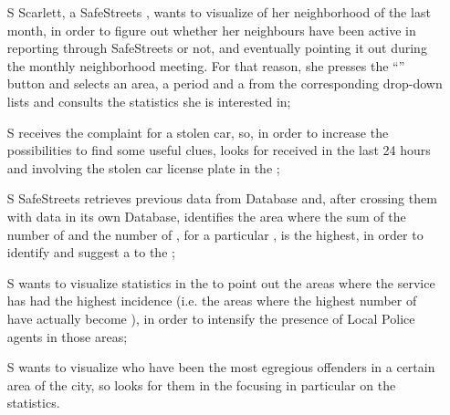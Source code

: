 \documentclass[../../../RASD.tex]{subfiles}
\begin{document}
\begin{itemize}
	\item[S\subs{5}]Scarlett, a SafeStreets , wants to visualize  of her neighborhood of the last month, in order to figure out whether her neighbours have been active in reporting  through SafeStreets or not, and eventually pointing it out during the monthly neighborhood meeting. For that reason, she presses the “” button and selects an area, a period and a  from the corresponding drop-down lists and consults the statistics she is interested in;
	
	\item[S\subs{6}] receives the complaint for a stolen car, so, in order to increase the possibilities to find some useful clues, looks for  received in the last 24 hours and involving the stolen car license plate in the ;
	
	\item[S\subs{7}]SafeStreets retrieves previous  data from  Database and, after crossing them with  data in its own Database, identifies the area where the sum of the number of  and the number of , for a particular , is the highest, in order to identify and suggest a  to the ;
	
	\item[S\subs{8}] wants to visualize  statistics in the  to point out the areas where the service has had the highest incidence (i.e. the areas where the highest number of  have actually become ), in order to intensify the presence of Local Police agents in those areas;
	
	\item[S\subs{9}] wants to visualize who have been the most egregious offenders in a certain area of the city, so looks for them in the  focusing in particular on the  statistics.
	
\end{itemize}
\end{document}
